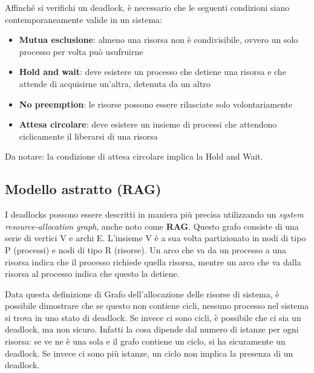 \documentclass[a4]{article}
\begin{document}
Affinché si verifichi un deadlock, è necessario che le seguenti condizioni siano contemporaneamente valide in un sistema:
\begin{itemize}
    \item \textbf{Mutua esclusione}: almeno una risorsa non è condivisibile, ovvero un solo processo per volta può usufruirne
    \item \textbf{Hold and wait}: deve esistere un processo che detiene una risorsa e che attende di acquisirne un'altra, detenuta da un altro
    \item \textbf{No preemption}: le risorse possono essere rilasciate solo volontariamente
    \item \textbf{Attesa circolare}: deve esistere un insieme di processi che attendono ciclicamente il liberarsi di una risorsa
\end{itemize}
Da notare: la condizione di attesa circolare implica la Hold and Wait.

\subsection{Modello astratto (RAG)}
I deadlocks possono essere descritti in maniera più precisa utilizzando un \textit{system resource-allocation graph}, anche noto come \textbf{RAG}. Questo grafo consiste di una serie di vertici V e archi E. L'insieme V è a sua volta partizionato in nodi di tipo P (processi) e nodi di tipo R (risorse). Un arco che va da un processo a una risorsa indica che il processo richiede quella risorsa, mentre un arco che va dalla risorsa al processo indica che questo la detiene.

Data questa definizione di Grafo dell'allocazione delle risorse di sistema, è possibile dimostrare che se questo non contiene cicli, nessuno processo nel sistema si trova in uno stato di deadlock. Se invece ci sono cicli, è possibile che ci sia un deadlock, ma non sicuro. Infatti la cosa dipende dal numero di istanze per ogni risorsa: se ve ne è una sola e il grafo contiene un ciclo, si ha sicuramente un deadlock. Se invece ci sono più istanze, un ciclo non implica la presenza di un deadlock.
\end{document}
